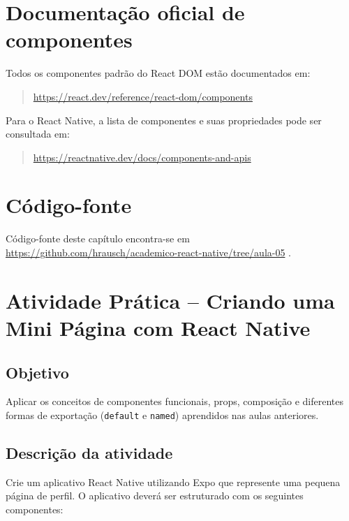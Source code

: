 \section{Documentação oficial de componentes}

Todos os componentes padrão do React DOM estão documentados em:

\begin{quote}
\url{https://react.dev/reference/react-dom/components}
\end{quote}

Para o React Native, a lista de componentes e suas propriedades pode ser consultada em:

\begin{quote}
\url{https://reactnative.dev/docs/components-and-apis}
\end{quote}


\section*{Código-fonte}
Código-fonte deste capítulo encontra-se em \href{https://github.com/hrausch/academico-react-native/tree/aula-05}{https://github.com/hrausch/academico-react-native/tree/aula-05} .

\section*{Atividade Prática – Criando uma Mini Página com React Native}

\subsection*{Objetivo}
Aplicar os conceitos de componentes funcionais, props, composição e diferentes formas de exportação (\texttt{default} e \texttt{named}) aprendidos nas aulas anteriores.

\subsection*{Descrição da atividade}

Crie um aplicativo React Native utilizando Expo que represente uma pequena página de perfil. O aplicativo deverá ser estruturado com os seguintes componentes:

